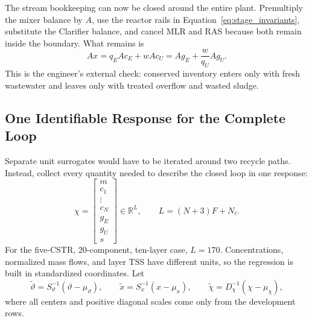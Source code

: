 \documentclass[a4paper,fleqn]{cas-sc}
\newcommand{\R}{\mathbb{R}}
\begin{document}
The stream bookkeeping can now be closed around the entire plant. Premultiply the mixer balance by $A$, use the reactor rails in Equation~\eqref{eq:stage_invariants}, substitute the Clarifier balance, and cancel MLR and RAS because both remain inside the boundary. What remains is
\begin{equation}
\label{eq:plant_boundary_invariant}
Ax=q_EAc_E+wAc_U
=Ag_E+\frac{w}{q_U}Ag_U.
\end{equation}
This is the engineer's external check: conserved inventory enters only with fresh wastewater and leaves only with treated overflow and wasted sludge.

\subsection{One Identifiable Response for the Complete Loop}

Separate unit surrogates would have to be iterated around two recycle paths. Instead, collect every quantity needed to describe the closed loop in one response:
\begin{equation}
\label{eq:stacked_state}
\chi=
\begin{bmatrix}
m\\c_1\\\vdots\\c_N\\g_E\\g_U\\s
\end{bmatrix}
\in\R^L,
\qquad
L=(N+3)F+N_\ell.
\end{equation}
For the five-CSTR, 20-component, ten-layer case, $L=170$. Concentrations, normalized mass flows, and layer TSS have different units, so the regression is built in standardized coordinates. Let
\begin{equation}
\label{eq:standardized_inputs_states}
\widetilde\vartheta=S_\vartheta^{-1}(\vartheta-\mu_\vartheta),\qquad
\widetilde x=S_x^{-1}(x-\mu_x),\qquad
\widetilde\chi=D_\chi^{-1}(\chi-\mu_\chi),
\end{equation}
where all centers and positive diagonal scales come only from the development rows.
\end{document}
